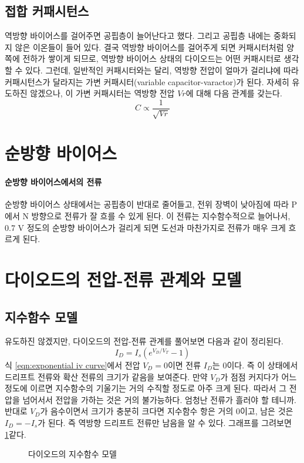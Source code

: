 \subsection{접합 커패시턴스}
역방향 바이어스를 걸어주면 공핍층이 늘어난다고 했다. 그리고 공핍층 내에는 중화되지 않은 이온들이 들어 있다. 결국 역방향 바이어스를 걸어주게 되면 커패시터처럼 양쪽에 전하가 쌓이게 되므로, 역방향 바이어스 상태의 다이오드는 어떤 커패시터로 생각할 수 있다.
그런데, 일반적인 커패시터와는 달리, 역방향 전압이 얼마가 걸리냐에 따라 커패시턴스가 달라지는 가변 커패시터(variable capacitor-varactor)가 된다. 자세히 유도하진 않겠으나, 이 가변 커패시터는 역방향 전압 $Vr$에 대해 다음 관계를 갖는다.
\begin{equation}
    C\varpropto \frac{1}{\sqrt{Vr}}
\end{equation}
\section{순방향 바이어스}
\paragraph{순방향 바이어스에서의 전류}
순방향 바이어스 상태에서는 공핍층이 반대로 줄어들고, 전위 장벽이 낮아짐에 따라 P에서 N 방향으로 전류가 잘 흐를 수 있게 된다. 이 전류는 지수함수적으로 늘어나서, 0.7 V 정도의 순방향 바이어스가 걸리게 되면 도선과 마찬가지로 전류가 매우 크게 흐르게 된다.

\section{다이오드의 전압-전류 관계와 모델}
\subsection{지수함수 모델}
유도하진 않겠지만, 다이오드의 전압-전류 관계를 풀어보면 다음과 같이 정리된다.
\begin{equation}
    I_D=I_s(e^{V_D/V_T}-1)\label{eqn:exponential iv curve}
\end{equation}
식 \ref{eqn:exponential iv curve}에서 전압 $V_D=0$이면 전류 $I_D$는 0이다. 즉 이 상태에서 드리프트 전류와 확산 전류의 크기가 같음을 보여준다.
만약 $V_D$가 점점 커지다가 어느 정도에 이르면 지수함수의 기울기는 거의 수직할 정도로 아주 크게 된다. 따라서 그 전압을 넘어서서 전압을 가하는 것은 거의 불가능하다. 엄청난 전류가 흘러야 할 테니까.
반대로 $V_D$가 음수이면서 크기가 충분히 크다면 지수함수 항은 거의 0이고, 남은 것은 $I_D=-I_s$가 된다. 즉 역방향 드리프트 전류만 남음을 알 수 있다.
그래프를 그려보면 \figurename~ \ref{fig:exponential iv model}\과 같다.
\begin{figure}[!tbp]
    \centering
    \caption{다이오드의 지수함수 모델}\label{fig:exponential iv model}
\end{figure}
